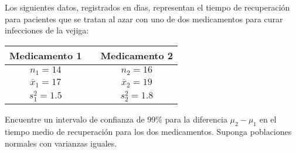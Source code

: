 \begin{enunciado}
 Los siguientes datos, registrados en d\'{\i}as, representan el tiempo de recuperaci\'on para pacientes que se tratan al azar con uno de dos medicamentos para curar infecciones de la vejiga:
 \begin{center}
  \begin{tabular}{ccc}
   \textbf{Medicamento 1} & \hspace{1cm} & \textbf{Medicamento 2} \\
   \hline 
   $n_1 = 14$ & & $n_2 = 16$ \\
   $\bar{x}_1 = 17$ & & $\bar{x}_2 = 19$ \\
   $s_1^2 = 1.5$ & & $s_2^2 = 1.8$
  \end{tabular}
 \end{center}
 Encuentre un intervalo de confianza de $99\%$ para la diferencia $\mu_2 - \mu_1$ en el tiempo medio de recuperaci\'on para los dos medicamentos. Suponga poblaciones normales con varianzas iguales.
\end{enunciado}

